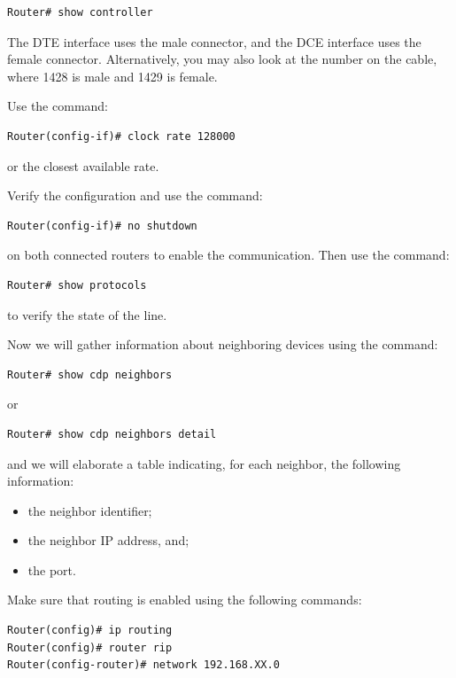 \begin{lstlisting}
Router# show controller
\end{lstlisting}

The DTE interface uses the male connector, and the DCE interface uses the female connector. Alternatively, you may also look at the number on the cable, where 1428 is male and 1429 is female.

Use the command:

\begin{lstlisting}
Router(config-if)# clock rate 128000
\end{lstlisting}

or the closest available rate.

Verify the configuration and use the command:

\begin{lstlisting}
Router(config-if)# no shutdown
\end{lstlisting}

on both connected routers to enable the communication. Then use the command:

\begin{lstlisting}
Router# show protocols
\end{lstlisting}

to verify the state of the line.

Now we will gather information about neighboring devices using the command:

\begin{lstlisting}
Router# show cdp neighbors
\end{lstlisting}

or

\begin{lstlisting}
Router# show cdp neighbors detail
\end{lstlisting}

and we will elaborate a table indicating, for each neighbor, the following information:

\begin{itemize}
\item the neighbor identifier;
\item the neighbor IP address, and;
\item the port.
\end{itemize}

Make sure that routing is enabled using the following commands:

\begin{lstlisting}
Router(config)# ip routing
Router(config)# router rip
Router(config-router)# network 192.168.XX.0
\end{lstlisting}


